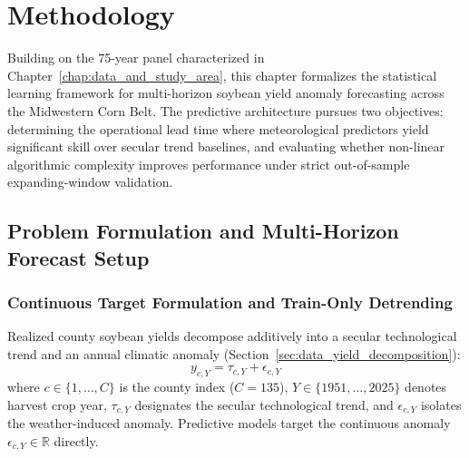 \chapter{Methodology}
\label{chap:methodology}

Building on the 75-year panel characterized in Chapter~\ref{chap:data_and_study_area}, this chapter formalizes the statistical learning framework for multi-horizon soybean yield anomaly forecasting across the Midwestern Corn Belt. The predictive architecture pursues two objectives: determining the operational lead time where meteorological predictors yield significant skill over secular trend baselines, and evaluating whether non-linear algorithmic complexity improves performance under strict out-of-sample expanding-window validation.


\section{Problem Formulation and Multi-Horizon Forecast Setup}
\label{sec:meth_problem_setup}

\subsection{Continuous Target Formulation and Train-Only Detrending}
\label{sec:meth_target_formulation}

Realized county soybean yields decompose additively into a secular technological trend and an annual climatic anomaly (Section~\ref{sec:data_yield_decomposition}):
\begin{equation}
    y_{c,Y} = \tau_{c,Y} + \epsilon_{c,Y}
    \label{eq:yield_additive_decomp}
\end{equation}
where $c \in \{1, \dots, C\}$ is the county index ($C = 135$), $Y \in \{1951, \dots, 2025\}$ denotes harvest crop year, $\tau_{c,Y}$ designates the secular technological trend, and $\epsilon_{c,Y}$ isolates the weather-induced anomaly. Predictive models target the continuous anomaly $\epsilon_{c,Y} \in \mathbb{R}$ directly.

